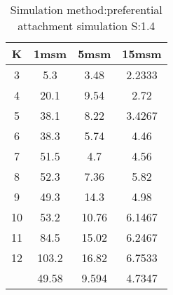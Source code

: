\begin{table}[H]
\centering
\begin{tabular}{c|ccc}
K &1msm &5msm &15msm\\
\hline
3 & 5.3 & 3.48 & 2.2333\\
4 & 20.1 & 9.54 & 2.72\\
5 & 38.1 & 8.22 & 3.4267\\
6 & 38.3 & 5.74 & 4.46\\
7 & 51.5 & 4.7 & 4.56\\
8 & 52.3 & 7.36 & 5.82\\
9 & 49.3 & 14.3 & 4.98\\
10 & 53.2 & 10.76 & 6.1467\\
11 & 84.5 & 15.02 & 6.2467\\
12 & 103.2 & 16.82 & 6.7533\\
\hline
& 49.58 & 9.594 & 4.7347\\
\end{tabular}
\caption{Simulation method:preferential attachment simulation S:1.4}
\label{tab:s1.4}
\end{table}
